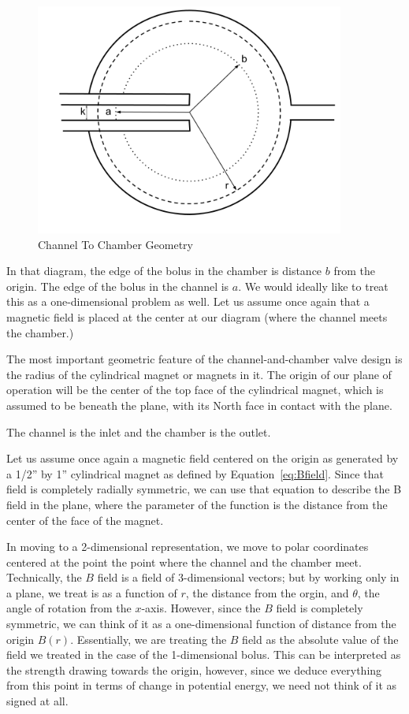 \documentclass{asme2ej}
\begin{document}
\begin{figure}
\centerline{\includegraphics[width=4in]{figure/ChannelToChamber.png}}
\caption{Channel To Chamber Geometry}
\label{fig:ChannelToChamber}
\end{figure}

In that diagram, the edge of the bolus in the chamber is distance $b$ from the
origin. The edge of the bolus in the channel is $a$.
We would ideally like to treat this as a one-dimensional problem as well.
Let us assume once again that a magnetic field is placed at the center
at our diagram (where the channel meets the chamber.)

The most important geometric feature of the channel-and-chamber
valve design is the radius of the cylindrical magnet or magnets
in it. The origin of our plane of operation
will be the center of the top face of the cylindrical magnet,
which is assumed to be beneath the plane, with its North face
in contact with the plane.

The channel is the inlet and the chamber is the
outlet.

Let us assume once again a magnetic field centered on the origin as generated by a
1/2'' by 1'' cylindrical magnet as defined by Equation~\ref{eq:Bfield}.
Since that field is completely radially symmetric, we can use that equation to
describe the B field in the plane, where the parameter of the function
is the distance from the center of the face of the magnet.

In moving to a 2-dimensional representation, we move to polar coordinates
centered at the point the point where the channel and the chamber meet.
Technically, the $B$ field is a field of 3-dimensional vectors; but
by working only in a plane, we treat is as a function of $r$, the distance
from the orgin, and $\theta$, the angle of rotation from the $x$-axis. However,
since the $B$ field is completely symmetric, we can think of it as a one-dimensional
function of distance from the origin $B(r)$. Essentially, we are treating the
$B$ field as the absolute value of the field we treated in the case of the 1-dimensional
bolus.
This can be interpreted as the strength drawing towards the origin, however, since
we deduce everything from this point in terms of change in potential energy,
we need not think of it as signed at all.
\end{document}
